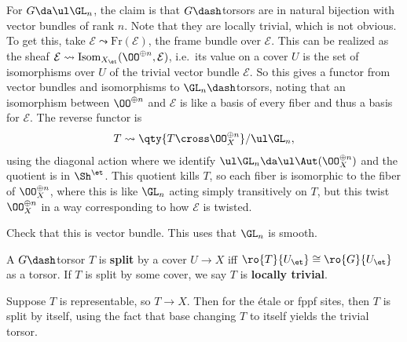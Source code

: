 \begin{example}[?]

For \(G \da \ul \GL_n\), the claim is that \(G\dash\)torsors are in
natural bijection with vector bundles of rank \(n\). Note that they are
locally trivial, which is not obvious. To get this, take
\(\mathcal{E}\leadsto \mathrm{Fr}(\mathcal{E})\), the frame bundle over
\(\mathcal{E}\). This can be realized as the sheaf
\(\mathcal{E}\leadsto \mathrm{Isom}_{X_\et}(\OO^{\oplus n}, \mathcal{E})\),
i.e.~its value on a cover \(U\) is the set of isomorphisms over \(U\) of
the trivial vector bundle \(\mathcal{E}\). So this gives a functor from
vector bundles and isomorphisms to \(\GL_n\dash\)torsors, noting that an
isomorphism between \(\OO^{\oplus n}\) and \(\mathcal{E}\) is like a
basis of every fiber and thus a basis for \(\mathcal{E}\). The reverse
functor is
\begin{align*}  
T \leadsto \qty{T\cross \OO_X^{\oplus n}} / \ul \GL_n
,\end{align*} using the diagonal action where we identify
\(\ul \GL_n \da \ul\Aut(\OO_X^{\oplus n})\) and the quotient is in
\(\Sh^\et\). This quotient kills \(T\), so each fiber is isomorphic to
the fiber of \(\OO_X^{\oplus n}\), where this is like \(\GL_n\) acting
simply transitively on \(T\), but this twist \(\OO_X^{\oplus n}\) in a
way corresponding to how \(\mathcal{E}\) is twisted.

\begin{exercise}[?]

Check that this is vector bundle. This uses that \(\GL_n\) is smooth.

\end{exercise}

\end{example}

\begin{definition}[?]

A \(G\dash\)torsor \(T\) is \textbf{split} by a cover \(U\to X\) iff
\(\ro{T}{U_\et} \cong \ro{G}{U_\et}\) as a torsor. If \(T\) is split by
some cover, we say \(T\) is \textbf{locally trivial}.

\end{definition}

\begin{remark}

Suppose \(T\) is representable, so \(T\to X\). Then for the étale or
fppf sites, then \(T\) is split by itself, using the fact that base
changing \(T\) to itself yields the trivial torsor.

\end{remark}

